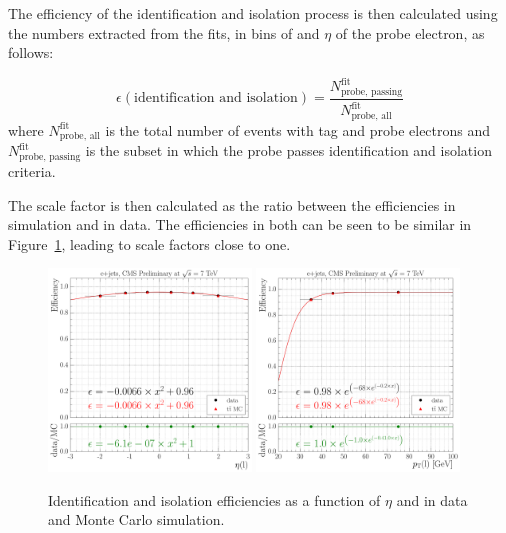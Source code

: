 The efficiency of the identification and isolation process is then calculated using the numbers extracted
from the fits, in bins of \pt and $\eta$ of the probe electron, as follows:

\begin{equation}
\epsilon(\text{identification and isolation}) = \frac{N^{\text{fit}}_{\text{probe, passing}}}{N^{\text{fit}}_{\text{probe, all}}}
\end{equation}
where $N^{\text{fit}}_{\text{probe, all}}$ is the total number of events with tag and probe electrons and
$N^{\text{fit}}_{\text{probe, passing}}$ is the subset in which the probe passes identification and isolation
criteria.

The scale factor is then calculated as the ratio between the efficiencies in simulation and in data. The
efficiencies in both can be seen to be similar in Figure~\ref{fig:electron_id_iso_efficiencies_wrt_eta_pt},
leading to scale factors close to one.

\begin{figure}[hbtp]
    \centering
      \includegraphics[width=0.48\textwidth]{Chapters/07_08_09_Analysis/Images/lepton_scale_factors/CBConvolution/electron/efficiency_eta_id_iso}\hfill
      \includegraphics[width=0.48\textwidth]{Chapters/07_08_09_Analysis/Images/lepton_scale_factors/CBConvolution/electron/efficiency_pt_id_iso}
      \caption[Identification and isolation efficiencies as a function of $\eta$ and \pt in data and \ttbar
      Monte Carlo simulation.]{Identification and isolation efficiencies as a function of $\eta$ and \pt in data and \ttbar
      Monte Carlo simulation.}
     \label{fig:electron_id_iso_efficiencies_wrt_eta_pt}
\end{figure}

